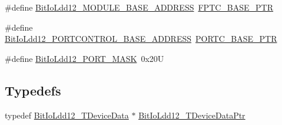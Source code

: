 \begin{DoxyCompactItemize}
\#define \hyperlink{group___bit_io_ldd12__module_ga6170dd543f9cd3c2b62d8856c1778680}{Bit\+Io\+Ldd12\+\_\+\+M\+O\+D\+U\+L\+E\+\_\+\+B\+A\+S\+E\+\_\+\+A\+D\+D\+R\+E\+SS}~\hyperlink{group___backward___compatibility___symbols_gaed3b8398ebed63795f9ce57eb9a59097}{F\+P\+T\+C\+\_\+\+B\+A\+S\+E\+\_\+\+P\+TR}
\item 
\#define \hyperlink{group___bit_io_ldd12__module_ga614ce455cfc960509cf0efab9d0de6c6}{Bit\+Io\+Ldd12\+\_\+\+P\+O\+R\+T\+C\+O\+N\+T\+R\+O\+L\+\_\+\+B\+A\+S\+E\+\_\+\+A\+D\+D\+R\+E\+SS}~\hyperlink{group___p_o_r_t___peripheral_ga03c740cdda17711afafc932723871474}{P\+O\+R\+T\+C\+\_\+\+B\+A\+S\+E\+\_\+\+P\+TR}
\item 
\#define \hyperlink{group___bit_io_ldd12__module_ga2f54135255fdce31bf38b46ec3cdd066}{Bit\+Io\+Ldd12\+\_\+\+P\+O\+R\+T\+\_\+\+M\+A\+SK}~0x20U
\end{DoxyCompactItemize}
\subsection*{Typedefs}
\begin{DoxyCompactItemize}
\item 
typedef \hyperlink{struct_bit_io_ldd12___t_device_data}{Bit\+Io\+Ldd12\+\_\+\+T\+Device\+Data} $\ast$ \hyperlink{group___bit_io_ldd12__module_gaf89bedffb46e6db2cef354573301a268}{Bit\+Io\+Ldd12\+\_\+\+T\+Device\+Data\+Ptr}
\end{DoxyCompactItemize}
